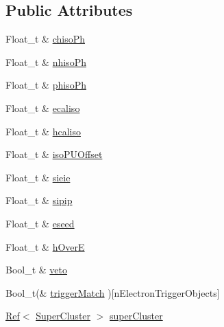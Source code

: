 \subsection*{Public Attributes}
\begin{DoxyCompactItemize}
\item 
Float\_\-t \& \hyperlink{classpanda_1_1Electron_a45c4dfccb2afa82a251c18019275cd59}{chisoPh}
\item 
Float\_\-t \& \hyperlink{classpanda_1_1Electron_a63c9ad9abcf7f57fac25a4cc2cf0c0e4}{nhisoPh}
\item 
Float\_\-t \& \hyperlink{classpanda_1_1Electron_acc1bedc35d474dadf9e54f5309866eda}{phisoPh}
\item 
Float\_\-t \& \hyperlink{classpanda_1_1Electron_a67e15ea6d6a8ad9ca9123fb50e095241}{ecaliso}
\item 
Float\_\-t \& \hyperlink{classpanda_1_1Electron_ab2ef27643d09d31cefac59c900a32c80}{hcaliso}
\item 
Float\_\-t \& \hyperlink{classpanda_1_1Electron_a557e17a14d575d9267e9b7caa291ff3f}{isoPUOffset}
\item 
Float\_\-t \& \hyperlink{classpanda_1_1Electron_ab7c3817af811a716b1942fa545163996}{sieie}
\item 
Float\_\-t \& \hyperlink{classpanda_1_1Electron_af63a95ef4a12371e908ec390aaff9c37}{sipip}
\item 
Float\_\-t \& \hyperlink{classpanda_1_1Electron_aa3cf96c4368cde3a6ecfe55905b456f7}{eseed}
\item 
Float\_\-t \& \hyperlink{classpanda_1_1Electron_a1a6590866278504775ef609cde68e171}{hOverE}
\item 
Bool\_\-t \& \hyperlink{classpanda_1_1Electron_acaa07729d3fd779aea2837d4acd7c284}{veto}
\item 
Bool\_\-t(\& \hyperlink{classpanda_1_1Electron_a416b97f96a625647771934f8d4f8e53d}{triggerMatch} )\mbox{[}nElectronTriggerObjects\mbox{]}
\item 
\hyperlink{classpanda_1_1Ref}{Ref}$<$ \hyperlink{classpanda_1_1SuperCluster}{SuperCluster} $>$ \hyperlink{classpanda_1_1Electron_aa390943fba270ca2e54f846e67aa20be}{superCluster}
\end{DoxyCompactItemize}
